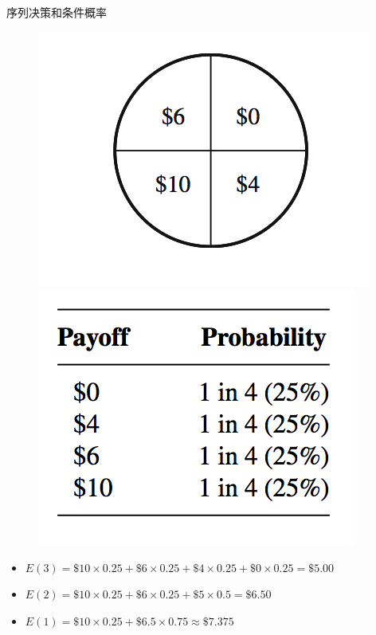 \documentclass[mathserif, table]{beamer}
\begin{document}
\begin{frame}{序列决策和条件概率}
  
  \begin{figure}
    \includegraphics[height=0.4\textheight{}]{lunpan.png}
    \includegraphics[height=0.4\textheight{}]{payoff.png}
  \end{figure}

  \begin{itemize}
  \item<1-> $E(3) = \$10 \times 0.25 + \$6 \times 0.25 + \$4 \times 0.25 + \$0 \times 0.25 = \$5.00$
  \item<2-> $E(2) = \$10 \times 0.25 + \$6 \times 0.25 + \$5 \times 0.5 = \$6.50$
  \item<3-> $E(1) = \$10 \times 0.25 + \$6.5 \times 0.75 \approx \$7.375$
  \end{itemize}

\end{frame}
\end{document}
